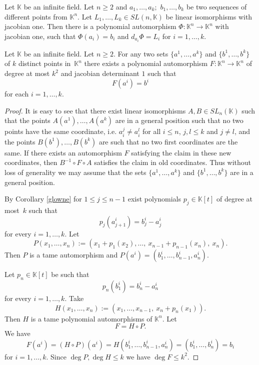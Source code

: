 \documentclass[10pt,a4paper]{amsart}
\newcommand{\K}{\mathbb{K}}
\begin{document}
\begin{theorem}\label{glowne}
Let $\K$ be an infinite field. Let  $n\ge 2$ and $a_1,\ldots, a_k; $ $b_1,\ldots , b_k$ be two sequences of different points from $\K^n.$ Let $L_1,\ldots, L_k\in SL(n,\K)$ be linear isomorphisms with 
jacobian one. 
Then there is a polynomial automorphism $\Phi: \K^n\to \K^n$ with jacobian one, such that $\Phi(a_i)=b_i$ and $d_{a_i} \Phi= L_i$ for $i=1,\ldots, k.$
\end{theorem}

\begin{theorem}\label{thm:pointautomorphism}
Let $\K$ be an infinite field. Let $n\ge 2$. 
For any two sets   $\{a^1,\ldots,a^k\}$ and $\{b^1,\ldots,b^k\}$  of $k$ distinct points in~$\K^n$ there exists a polynomial automorphism $F:\K^n \to \K^n$ of degree at most $k^2$ and jacobian determinant $1$ such that
$$ F(a^i) = b^i $$
for each $i=1,\dots,k$.
\end{theorem}

\begin{proof}

It is easy to see that there exist linear isomorphisms $A,B\in SL_n(\K)$ such that the points $A(a^1),\dots, A(a^k)$  are in a general position such that no two points have the same coordinate, i.e.  $a_i^j\neq a_i^l$ for all $i\leq n$, $j, l\leq k$ and $j\neq l$, and the points $B(b^1),\dots,B(b^k)$ are such that no two first coordinates are the same. If there exists an automorphism $F$ satisfying the claim in these new coordinates, then $B^{-1}\circ F\circ A$ satisfies the claim in old coordinates. Thus without loss of generality we may assume that the sets  $\{a^1,\ldots,a^k\}$ and $\{b^1,\ldots,b^k\}$ are in a general position.

By Corollary \ref{glowne} for $1\leq j \leq n-1$ exist polynomials $p_j\in \K[t]$ of degree at most~$k$  such that 
$$p_j(a^{i}_{j+1})=b^{i}_{j}-a^{i}_{j}$$
for every $i=1,\dots, k$.
Let
$$P(x_1,\dots, x_n):=(x_1+p_{1}(x_{2}),\dots,\ x_{n-1}+p_{n-1}(x_{n}),\ x_n).$$
Then $P$ is a tame automorphism and $P(a^i)=(b^{i}_{1},\dots, b^{i}_{n-1}, a^{i}_{n}).$


Let $p_n\in\K[t]$ be such that 
$$p_n(b^{i}_{1})=b^{i}_{n}-a^{i}_{n}$$
for every $i=1,\dots,k$. 
Take
$$H(x_1,\dots,x_n):=(x_1,\dots,x_{n-1},\ x_n+p_n(x_1)).$$
Then  $H$ is a tame polynomial automorphisms of $\K^n.$ Let $$F=  H\circ P.$$ 
We have
$$F(a^i)=  (H\circ P)(a^i)=H(b^{i}_{1},\dots, b^{i}_{n-1}, a^{i}_{n})=(b^{i}_{1},\dots, b^{i}_{n})=b_i $$
 for $i=1,\dots, k.$ Since $\deg P, \deg H\le k$ we have $\deg F\le k^2.$
\end{proof}
\end{document}
